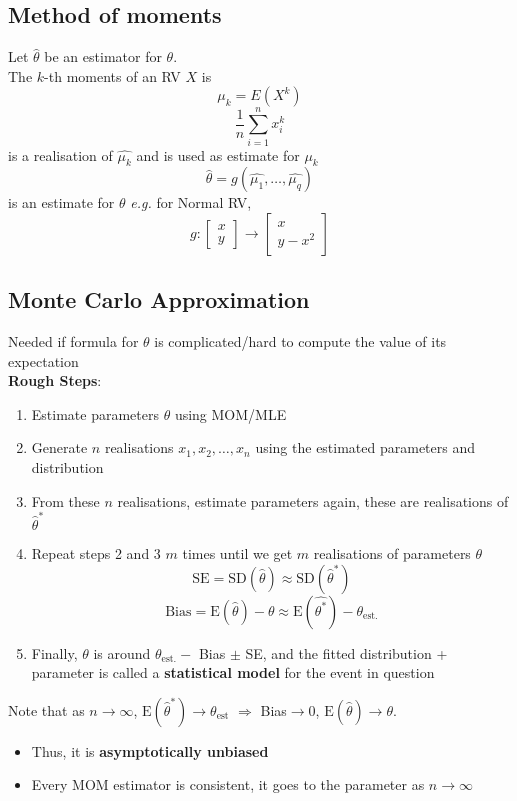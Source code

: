 \documentclass{article}
\begin{document}
\begin{multicols}{2}
\subsection{Method of moments}
Let $\hat{\theta}$ be an estimator for $\theta$.\\
The $k$-th moments of an RV $X$ is
$$\mu_k = E(X^k)$$
$$\frac{1}{n}\sum_{i=1}^{n}x_i^k$$
is a realisation of $\hat{\mu_k}$ and is used as estimate for $\mu_k$
$$\hat{\theta} = g(\hat{\mu_1}, \dots, \hat{\mu_q})$$
is an estimate for $\theta$ \textit{e.g.} for Normal RV,
$$g : \left[ \begin{matrix}
	x \\
	y
\end{matrix}\right] \rightarrow \left[ \begin{matrix}
x \\
y-x^2
\end{matrix}\right]$$
\subsection{Monte Carlo Approximation}
Needed if formula for $\theta$ is complicated/hard to compute the value of its expectation\\
\textbf{Rough Steps}:
\begin{enumerate}
	\item Estimate parameters $\theta$ using MOM/MLE
	\item Generate $n$ realisations $x_1, x_2, \dots, x_n$ using the estimated parameters and distribution
	\item From these $n$ realisations, estimate parameters again, these are realisations of $\hat{\theta}^*$
	\item Repeat steps 2 and 3 $m$ times until we get $m$ realisations of parameters $\theta$
	$$\text{SE} = \text{SD}(\hat{\theta}) \approx \text{SD}(\hat{\theta}^*)$$
	$$\text{Bias} = \text{E}(\hat{\theta}) - \theta \approx \text{E}(\hat{\theta^*}) - \theta_{\text{est.}}$$
	\item Finally, $\theta$ is around $\theta_{\text{est.}} -$ Bias $\pm$ SE, and the fitted distribution + parameter is called a \textbf{statistical model} for the event in question
\end{enumerate}
Note that as $n\rightarrow \infty$, $\text{E}(\hat{\theta}^*) \rightarrow \theta_{\text{est}}$ $\Rightarrow$ Bias$\rightarrow 0$, $\text{E}(\hat{\theta}) \rightarrow \theta$.
\begin{itemize}
	\item Thus, it is \textbf{asymptotically unbiased}
	\item Every MOM estimator is consistent, it goes to the parameter as $n \rightarrow \infty$
\end{itemize}


\end{multicols}
\end{document}
